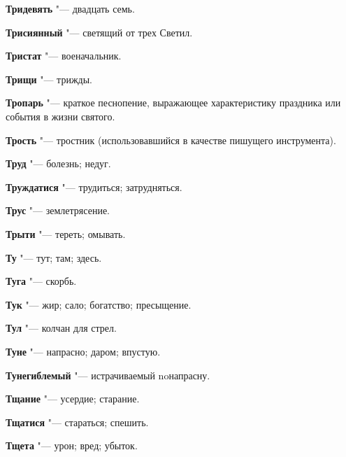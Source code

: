 \begin{mymulticols}{2}
\noindent\textbf{Тридевять} "--- двадцать семь. 




\noindent\textbf{Трисиянный} "--- светящий от трех Светил. 




\noindent\textbf{Тристат} "--- военачальник. 




\noindent\textbf{Трищи} "--- трижды. 




\noindent\textbf{Тропарь} "--- краткое песнопение, выражающее характеристику праздника или события в жизни святого. 




\noindent\textbf{Трость} "--- тростник (использовавшийся в качестве пишущего инструмента). 




\noindent\textbf{Труд} "--- болезнь; недуг. 




\noindent\textbf{Труждатися} "--- трудиться; затрудняться. 




\noindent\textbf{Трус} "--- землетрясение. 




\noindent\textbf{Трыти} "--- тереть; омывать. 




\noindent\textbf{Ту} "--- тут; там; здесь. 




\noindent\textbf{Туга} "--- скорбь. 




\noindent\textbf{Тук} "--- жир; сало; богатство; пресыщение. 




\noindent\textbf{Тул} "--- колчан для стрел. 




\noindent\textbf{Туне} "--- напрасно; даром; впустую. 




\noindent\textbf{Тунегиблемый} "--- истрачиваемый noнапрасну. 




\noindent\textbf{Тщание} "--- усердие; старание. 




\noindent\textbf{Тщатися} "--- стараться; спешить. 




\noindent\textbf{Тщета} "--- урон; вред; убыток. 





\end{mymulticols}
